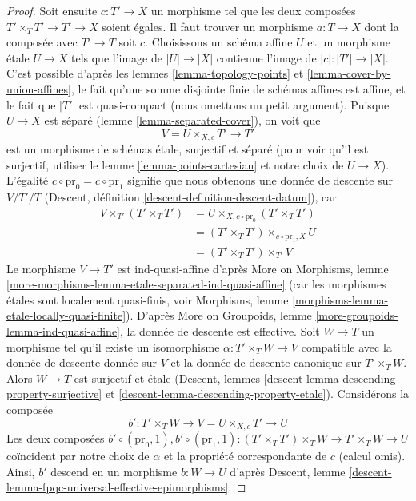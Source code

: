 \begin{proof}
\medskip\noindent
Soit ensuite $c : T' \to X$ un morphisme tel que les deux composées
$T' \times_T T' \to T' \to X$ soient égales. Il faut trouver un morphisme
$a : T \to X$ dont la composée avec $T' \to T$ soit $c$. Choisissons un
schéma affine $U$ et un morphisme \'etale $U \to X$ tels que l'image de
$|U| \to |X|$ contienne l'image de $|c| : |T'| \to |X|$.
C'est possible d'après les lemmes \ref{lemma-topology-points} et
\ref{lemma-cover-by-union-affines}, le fait qu'une somme disjointe finie de
schémas affines est affine, et le fait que $|T'|$ est quasi-compact
(nous omettons un petit argument). Puisque $U \to X$ est séparé
(lemme \ref{lemma-separated-cover}), on voit que
$$
V = U \times_{X, c} T' \longrightarrow T'
$$
est un morphisme de schémas \'etale, surjectif et séparé
(pour voir qu'il est surjectif, utiliser le lemme \ref{lemma-points-cartesian}
et notre choix de $U \to X$). L'égalité
$c \circ \text{pr}_0 = c \circ \text{pr}_1$ signifie que nous obtenons une
donnée de descente sur $V/T'/T$
(Descent, définition \ref{descent-definition-descent-datum}),
car
\begin{align*}
V \times_{T'} (T' \times_T T')
& =
U \times_{X, c \circ \text{pr}_0} (T' \times_T T') \\
& =
(T' \times_T T') \times_{c \circ \text{pr}_1, X} U \\
& =
(T' \times_T T') \times_{T'} V
\end{align*}
Le morphisme $V \to T'$ est ind-quasi-affine d'après
More on Morphisms, lemme
\ref{more-morphisms-lemma-etale-separated-ind-quasi-affine}
(car les morphismes \'etales sont localement quasi-finis, voir
Morphisms, lemme \ref{morphisms-lemma-etale-locally-quasi-finite}).
D'après More on Groupoids, lemme \ref{more-groupoids-lemma-ind-quasi-affine},
la donnée de descente est effective. Soit $W \to T$ un morphisme
tel qu'il existe un isomorphisme $\alpha : T' \times_T W \to V$
compatible avec la donnée de descente donnée sur $V$ et la donnée de descente
canonique sur $T' \times_T W$. Alors $W \to T$ est surjectif et \'etale
(Descent, lemmes \ref{descent-lemma-descending-property-surjective} et
\ref{descent-lemma-descending-property-etale}).
Considérons la composée
$$
b' : T' \times_T W \longrightarrow V = U \times_{X, c} T' \longrightarrow U
$$
Les deux composées
$b' \circ (\text{pr}_0, 1), 
b' \circ (\text{pr}_1, 1) :
(T' \times_T T') \times_T W \to T' \times_T W \to U$
coïncident par notre choix de $\alpha$ et la propriété correspondante de $c$
(calcul omis). Ainsi, $b'$ descend en un morphisme $b : W \to U$ d'après
Descent, lemme \ref{descent-lemma-fpqc-universal-effective-epimorphisms}.

\end{proof}
